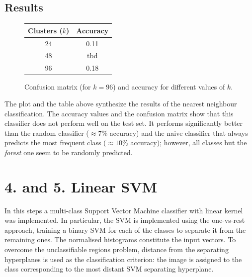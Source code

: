 \documentclass[12pt]{article}
\begin{document}
  \subsection*{Results}

  \begin{figure}[H]
    \centering
    \caption*{Confusion matrix (for \( k = 96 \)) and accuracy for different values of \( k \).}
    \quad\quad\quad
    \begin{tabular}[b]{cc}
			\toprule
      Clusters (\( k \)) & Accuracy \\
      \midrule
      24  & 0.11 \\
      48  & tbd \\
      96  & 0.18 \\
      \bottomrule
    \end{tabular}
  \end{figure}

  The plot and the table above synthesize the results of the nearest neighbour classification. The accuracy values and the confusion matrix show that this classifier does not perform well on the test set. It performs significantly better than the random classifier (\( \approx 7\% \) accuracy) and the naive classifier that always predicts the most frequent class (\( \approx 10\% \) accuracy); however, all classes but the \textit{forest} one seem to be randomly predicted.



  \section*{4. and 5. Linear SVM}

  In this steps a multi-class Support Vector Machine classifier with linear kernel was implemented. In particular, the SVM is implemented using the one-vs-rest approach, training a binary SVM for each of the classes to separate it from the remaining ones. The normalised histograms constitute the input vectors. To overcome the unclassifiable regions problem, distance from the separating hyperplanes is used as the classification criterion: the image is assigned to the class corresponding to the most distant SVM separating hyperplane.
\end{document}
